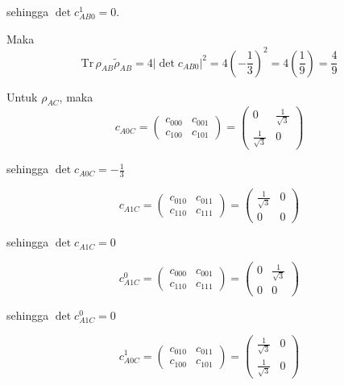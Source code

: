 \begin{enumerate}
	sehingga $\det c_{AB0}^1 = 0$.
	
	Maka
	\begin{equation}
		\mathrm{Tr}\,\rho_{AB}\tilde{\rho}_{AB}=4|\det c_{AB0}|^2=4(-\frac{1}{3})^2=4(\frac{1}{9})=\frac{4}{9}
	\end{equation}
	
	Untuk $\rho_{AC}$, maka
	\begin{equation}
		c_{A0C}=
		\begin{pmatrix}
			c_{000} & c_{001} \\
			c_{100} & c_{101}
		\end{pmatrix}=
		\begin{pmatrix}
			0 & \frac{1}{\sqrt{3}} \\
			\frac{1}{\sqrt{3}} & 0
		\end{pmatrix}
	\end{equation}
	
	sehingga $\det c_{A0C} = -\frac{1}{3}$
	
	\begin{equation}
		c_{A1C}=
		\begin{pmatrix}
			c_{010} & c_{011} \\
			c_{110} & c_{111}
		\end{pmatrix}=
		\begin{pmatrix}
			\frac{1}{\sqrt{3}} & 0 \\
			0 & 0
		\end{pmatrix}
	\end{equation}
	
	sehingga $\det c_{A1C} = 0$
	
	\begin{equation}
		c_{A1C}^0=
		\begin{pmatrix}
			c_{000} & c_{001} \\
			c_{110} & c_{111}
		\end{pmatrix}=
		\begin{pmatrix}
			0 & \frac{1}{\sqrt{3}} \\
			0 & 0
		\end{pmatrix}
	\end{equation}
	
	sehingga $\det c_{A1C}^0 = 0$
	
	\begin{equation}
		c_{A0C}^1=
		\begin{pmatrix}
			c_{010} & c_{011} \\
			c_{100} & c_{101}
		\end{pmatrix}=
		\begin{pmatrix}
			\frac{1}{\sqrt{3}} & 0 \\
			\frac{1}{\sqrt{3}} & 0
		\end{pmatrix}
	\end{equation}
	

\end{enumerate}
